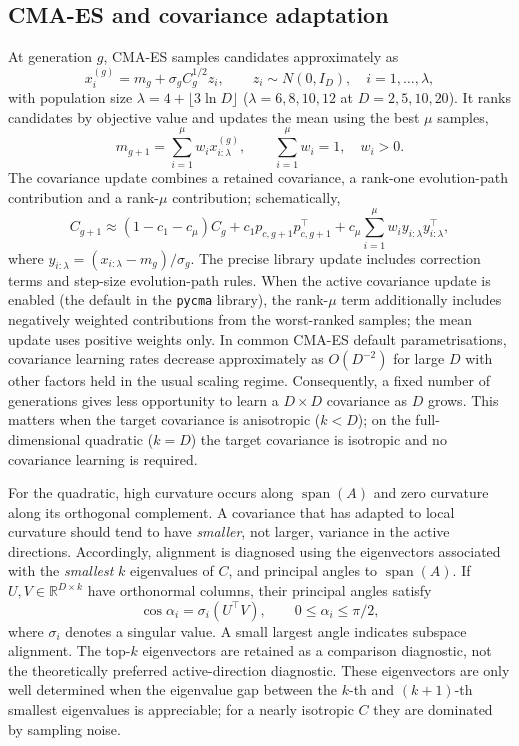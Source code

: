 \documentclass[11pt,a4paper]{article}
\newcommand{\R}{\mathbb{R}}
\begin{document}
\subsection{CMA-ES and covariance adaptation}
At generation $g$, CMA-ES samples candidates approximately as
\begin{equation}x_i^{(g)}=m_g+\sigma_g C_g^{1/2}z_i,\qquad z_i\sim N(0,I_D),\quad i=1,\ldots,\lambda,\end{equation}
with population size $\lambda=4+\lfloor3\ln D\rfloor$ ($\lambda=6,8,10,12$ at $D=2,5,10,20$). %
It ranks candidates by objective value and updates the mean using the best $\mu$ samples,
\begin{equation}m_{g+1}=\sum_{i=1}^{\mu}w_i x_{i:\lambda}^{(g)},\qquad \sum_{i=1}^{\mu}w_i=1,\quad w_i>0.\end{equation}
The covariance update combines a retained covariance, a rank-one evolution-path contribution and a rank-$\mu$ contribution; schematically,
\begin{equation}\label{eq:cma}
C_{g+1}\approx (1-c_1-c_\mu)C_g+c_1p_{c,g+1}p_{c,g+1}^\top+c_\mu\sum_{i=1}^{\mu}w_i y_{i:\lambda}y_{i:\lambda}^\top,
\end{equation}
where $y_{i:\lambda}=(x_{i:\lambda}-m_g)/\sigma_g$. The precise library update includes correction terms and step-size evolution-path rules. When the active covariance update is enabled (the default in the \texttt{pycma} library), the rank-$\mu$ term additionally includes negatively weighted contributions from the worst-ranked samples; the mean update uses positive weights only. %
In common CMA-ES default parametrisations, covariance learning rates decrease approximately as $O(D^{-2})$ for large $D$ with other factors held in the usual scaling regime. Consequently, a fixed number of generations gives less opportunity to learn a $D\times D$ covariance as $D$ grows. This matters when the target covariance is anisotropic ($k<D$); on the full-dimensional quadratic ($k=D$) the target covariance is isotropic and no covariance learning is required. %

For the quadratic, high curvature occurs along $\operatorname{span}(A)$ and zero curvature along its orthogonal complement. A covariance that has adapted to local curvature should tend to have \emph{smaller}, not larger, variance in the active directions. Accordingly, alignment is diagnosed using the eigenvectors associated with the \emph{smallest} $k$ eigenvalues of $C$, and principal angles to $\operatorname{span}(A)$. If $U,V\in\R^{D\times k}$ have orthonormal columns, their principal angles satisfy
\begin{equation}\cos\alpha_i=\sigma_i(U^\top V),\qquad 0\le\alpha_i\le\pi/2,\end{equation}
where $\sigma_i$ denotes a singular value. A small largest angle indicates subspace alignment. The top-$k$ eigenvectors are retained as a comparison diagnostic, not the theoretically preferred active-direction diagnostic. These eigenvectors are only well determined when the eigenvalue gap between the $k$-th and $(k+1)$-th smallest eigenvalues is appreciable; for a nearly isotropic $C$ they are dominated by sampling noise. %
\end{document}
